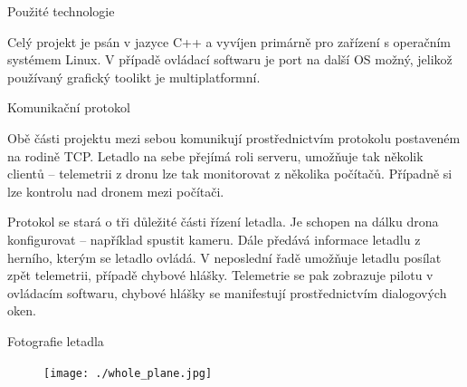 \documentclass[final]{beamer}
\newlength{\colwidth}
\begin{document}
\begin{frame}[t]
\begin{columns}[t]
\begin{column}{\colwidth}
\begin{block}{Použité technologie}
\begin{figure}
          \hfill
          \hfill

        \end{figure}

			Celý projekt je psán v jazyce C++ a vyvíjen primárně pro zařízení s operačním systémem Linux.
			V případě ovládací softwaru je port na další OS možný, jelikož používaný grafický toolikt je multiplatformní.



      \end{block}

      \begin{block}{Komunikační protokol}

				Obě části projektu mezi sebou komunikují prostřednictvím protokolu postaveném na rodině TCP.
				Letadlo na sebe přejímá roli serveru, umožňuje tak několik clientů -- telemetrii z dronu lze tak monitorovat z několika počítačů.
				Případně si lze  kontrolu nad dronem mezi počítači.

				Protokol se stará o tři důležité části řízení letadla.
				Je schopen na dálku drona konfigurovat -- například spustit kameru.
				Dále předává informace letadlu z herního, kterým se letadlo ovládá.
				V neposlední řadě umožňuje letadlu posílat zpět telemetrii, případě chybové hlášky.
				Telemetrie se pak zobrazuje pilotu v ovládacím softwaru, chybové hlášky se manifestují prostřednictvím dialogových oken.
      \end{block}

      \begin{block}{Fotografie letadla}


				\begin{figure}[h]
					\centering
					\texttt{[image: ./whole\_plane.jpg]}
				\end{figure}

      \end{block}

    \end{column}


\end{columns}
\end{frame}
\end{document}
